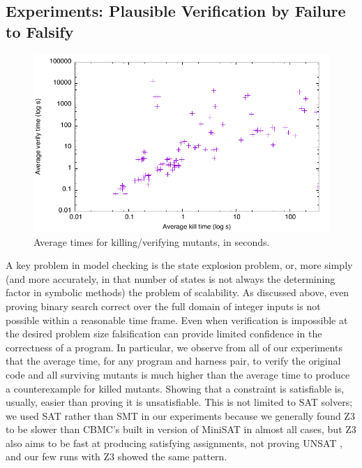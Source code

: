 \documentclass{svjour3}
\begin{document}

\subsection{Experiments: Plausible Verification by Failure to Falsify}
\label{sec:sattimes}

\begin{figure}
\includegraphics[width=\columnwidth]{sattimes}
\caption{Average times for killing/verifying mutants, in seconds.}
\label{fig:sattimes}
\end{figure}

A key problem in model checking is the state explosion problem, or,
more simply (and more accurately, in that number of states is not
always the determining factor in symbolic methods) the problem of
scalability.  As discussed above, even proving binary search correct
over the full domain of integer inputs is not possible within a
reasonable time frame.  Even when verification is impossible at the
desired problem size falsification can provide limited
confidence in the correctness of a program.  In particular, we observe
from all of our experiments that the average time, for any program and
harness pair, to verify the original code and all surviving mutants is
much higher than the average time to produce a counterexample
for killed mutants.  Showing that a constraint is satisfiable is,
usually, easier than proving it is unsatisfiable.  This is not limited
to SAT solvers; we used SAT rather than SMT in our experiments because
we generally found Z3 to be slower than CBMC's built in version of
MiniSAT\cite{minisat} in almost all cases, but Z3 also
aims to be fast at producing satisfying assignments, not proving UNSAT
\cite{z3}, and our few runs with Z3 showed the same pattern.
\end{document}

